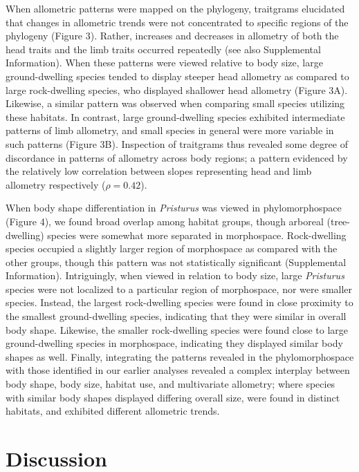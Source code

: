 \documentclass[
  11pt,
]{article}
\begin{document}
When allometric patterns were mapped on the phylogeny, traitgrams
elucidated that changes in allometric trends were not concentrated to
specific regions of the phylogeny (Figure 3). Rather, increases and
decreases in allometry of both the head traits and the limb traits
occurred repeatedly (see also Supplemental Information). When these
patterns were viewed relative to body size, large ground-dwelling
species tended to display steeper head allometry as compared to large
rock-dwelling species, who displayed shallower head allometry (Figure
3A). Likewise, a similar pattern was observed when comparing small
species utilizing these habitats. In contrast, large ground-dwelling
species exhibited intermediate patterns of limb allometry, and small
species in general were more variable in such patterns (Figure 3B).
Inspection of traitgrams thus revealed some degree of discordance in
patterns of allometry across body regions; a pattern evidenced by the
relatively low correlation between slopes representing head and limb
allometry respectively (\(\rho = 0.42\)). \hfill\break

When body shape differentiation in \emph{Pristurus} was viewed in
phylomorphospace (Figure 4), we found broad overlap among habitat
groups, though arboreal (tree-dwelling) species were somewhat more
separated in morphospace. Rock-dwelling species occupied a slightly
larger region of morphospace as compared with the other groups, though
this pattern was not statistically significant (Supplemental
Information). Intriguingly, when viewed in relation to body size, large
\emph{Pristurus} species were not localized to a particular region of
morphospace, nor were smaller species. Instead, the largest
rock-dwelling species were found in close proximity to the smallest
ground-dwelling species, indicating that they were similar in overall
body shape. Likewise, the smaller rock-dwelling species were found close
to large ground-dwelling species in morphospace, indicating they
displayed similar body shapes as well. Finally, integrating the patterns
revealed in the phylomorphospace with those identified in our earlier
analyses revealed a complex interplay between body shape, body size,
habitat use, and multivariate allometry; where species with similar body
shapes displayed differing overall size, were found in distinct
habitats, and exhibited different allometric trends.

\hypertarget{discussion}{%
\section{Discussion}\label{discussion}}
\end{document}
